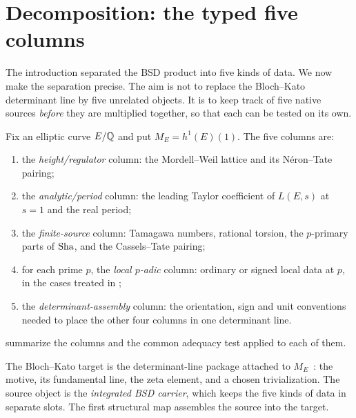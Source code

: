 \section{Decomposition: the typed five columns}
\label{sec:decomposition}

The introduction separated the BSD product into five kinds of data.  We now
make the separation precise.  The aim is not to replace the Bloch--Kato
determinant line by five unrelated objects.  It is to keep track of five
native sources \emph{before} they are multiplied together, so that each can
be tested on its own.

Fix an elliptic curve $E/\mathbb{Q}$ and put $M_E=h^1(E)(1)$.  The five columns are:
\begin{enumerate}
\item the \emph{height/regulator} column: the Mordell--Weil lattice and its
  N\'eron--Tate pairing;
\item the \emph{analytic/period} column: the leading Taylor coefficient of
  $L(E,s)$ at $s=1$ and the real period;
\item the \emph{finite-source} column: Tamagawa numbers, rational torsion,
  the $p$-primary parts of $\operatorname{Sha}$, and the Cassels--Tate pairing;
\item for each prime $p$, the \emph{local $p$-adic} column: ordinary or
  signed local data at $p$, in the cases treated in ;
\item the \emph{determinant-assembly} column: the orientation, sign and unit
  conventions needed to place the other four columns in one determinant
  line.
\end{enumerate}
 summarize the columns
and the common adequacy test applied to each of them.



The Bloch--Kato target is the determinant-line package attached to
$M_E$~\citep{Deligne1987,BlochKato1990,FontainePerrinRiou1994}: the motive,
its fundamental line, the zeta element, and a chosen trivialization.  The
source object is the \emph{integrated BSD carrier}, which keeps the five
kinds of data in separate slots.  The first structural map assembles the
source into the target.


